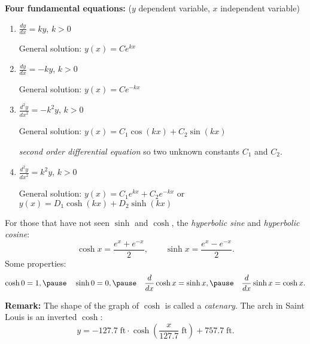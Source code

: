 \documentclass[10pt,aspectratio=169]{beamer}
\begin{document}
\begin{frame}
\textbf{Four fundamental equations:} ($y$ dependent variable, $x$ independent variable)

\medskip
\begin{enumerate}
\item\pause
$\displaystyle \frac{dy}{dx} = k y$, \quad $k > 0$

\medskip
\pause
General solution: \quad $y(x) = C e^{kx}$

\medskip
\item\pause
$\displaystyle \frac{dy}{dx} = -k y$, \quad $k > 0$

\medskip
\pause
General solution: \quad $y(x) = C e^{-kx}$

\medskip
\item\pause
$\displaystyle \frac{d^2y}{{dx}^2} = -k^2 y$, \quad $k > 0$

\medskip
\pause
General solution: \quad $y(x) = C_1 \cos(kx) + C_2 \sin(kx)$

\pause
\emph{second order differential equation} so two unknown constants $C_1$ and $C_2$.

\medskip
\item\pause
$\displaystyle \frac{d^2y}{{dx}^2} = k^2 y$, \quad $k > 0$

\medskip
\pause
General solution: \quad $y(x) = C_1 e^{kx}  + C_2 e^{-kx}$
\pause
\quad or \quad $y(x) = D_1 \cosh(kx) + D_2 \sinh(kx)$

\end{enumerate}

\end{frame}

\begin{frame}
For those that have not seen $\sinh$ and $\cosh$, the
\emph{hyperbolic sine} and \emph{hyperbolic cosine}:
\[
\cosh x = \frac{e^{x} + e^{-x}}{2} , \qquad
\sinh x = \frac{e^{x} - e^{-x}}{2} .
\]
\pause
Some properties:
\[
\cosh 0 = 1,
\pause
\quad
\sinh 0 = 0,
\pause
\quad
\frac{d}{dx} \cosh x = \sinh x,
\pause
\quad
\frac{d}{dx} \sinh x = \cosh x.
\]

\medskip
\pause
\textbf{Remark:} The shape of the graph of $\cosh$ is called a \emph{catenary}.
The arch in Saint Louis is an inverted $\cosh$:
\begin{equation*}
y = -127.7 \; \textrm{ft} \cdot \cosh\left(\frac{x}{127.7}  \;
\textrm{ft}\right) + 757.7 \; \textrm{ft} .
\end{equation*}


\end{frame}
\end{document}

